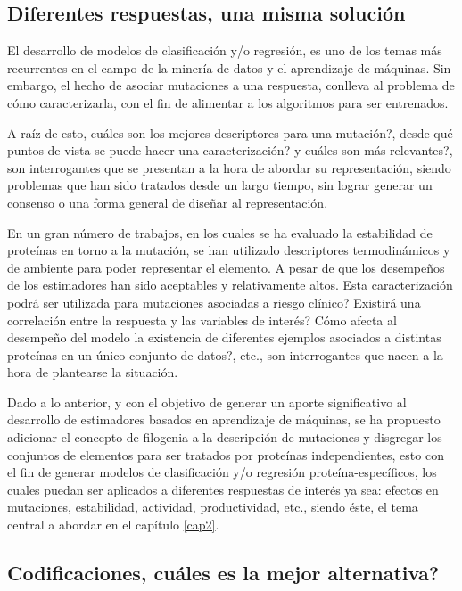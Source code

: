 \subsection{Diferentes respuestas, una misma solución}

El desarrollo de modelos de clasificación y/o regresión, es uno de los temas más recurrentes en el campo de la minería de datos y el aprendizaje de máquinas. Sin embargo, el hecho de asociar mutaciones a una respuesta, conlleva al problema de cómo caracterizarla, con el fin de alimentar a los algoritmos para ser entrenados. 

A raíz de esto, cuáles son los mejores descriptores para una mutación?, desde qué puntos de vista se puede hacer una caracterización? y cuáles son más relevantes?, son interrogantes que se presentan a la hora de abordar su representación, siendo problemas que han sido tratados desde un largo tiempo, sin lograr generar un consenso o una forma general de diseñar al representación. 

En un gran número de trabajos, en los cuales se ha evaluado la estabilidad de proteínas en torno a la mutación, se han utilizado descriptores termodinámicos y de ambiente para poder representar el elemento. A pesar de que los desempeños de los estimadores han sido aceptables y relativamente altos. Esta caracterización podrá ser utilizada para mutaciones asociadas a riesgo clínico? Existirá una correlación entre la respuesta y las variables de interés? Cómo afecta al desempeño del modelo la existencia de diferentes ejemplos asociados a distintas proteínas en un único conjunto de datos?, etc., son interrogantes que nacen a la hora de plantearse la situación.

Dado a lo anterior, y con el objetivo de generar un aporte significativo al desarrollo de estimadores basados en aprendizaje de máquinas, se ha propuesto adicionar el concepto de filogenia a la descripción de mutaciones y disgregar los conjuntos de elementos para ser tratados por proteínas independientes, esto con el fin de generar modelos de clasificación y/o regresión proteína-específicos, los cuales puedan ser aplicados a diferentes respuestas de interés ya sea: efectos en mutaciones, estabilidad, actividad, productividad, etc., siendo éste, el tema central a abordar en el capítulo \ref{cap2}.
 
\subsection{Codificaciones, cuáles es la mejor alternativa?}

